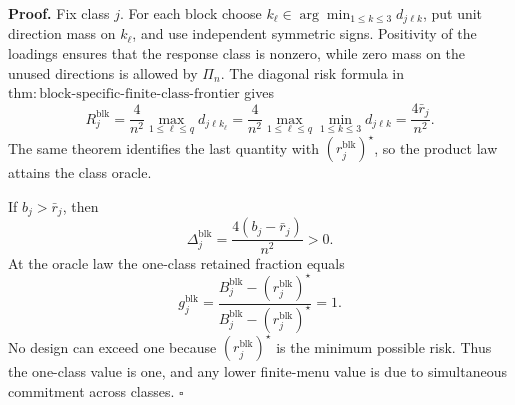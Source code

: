 \textbf{Proof.}
Fix class \(j\).  For each block choose \(k_\ell\in\arg\min_{1\le k\le3}d_{j\ell k}\), put unit direction mass on \(k_\ell\), and use independent symmetric signs.  Positivity of the loadings ensures that the response class is nonzero, while zero mass on the unused directions is allowed by \(\Pi_n\).  The diagonal risk formula in \(\mathrm{thm:block\text{-}specific\text{-}finite\text{-}class\text{-}frontier}\) gives
\[
R_j^{\mathrm{blk}}
=\frac4{n^2}\max_{1\le\ell\le q}d_{j\ell k_\ell}
=\frac4{n^2}\max_{1\le\ell\le q}\min_{1\le k\le3}d_{j\ell k}
=\frac{4\bar r_j}{n^2}.
\tag{1}
\]
The same theorem identifies the last quantity with \((r_j^{\mathrm{blk}})^\star\), so the product law attains the class oracle.

If \(b_j>\bar r_j\), then
\[
\Delta_j^{\mathrm{blk}}
=\frac{4(b_j-\bar r_j)}{n^2}>0.
\tag{2}
\]
At the oracle law the one-class retained fraction equals
\[
g_j^{\mathrm{blk}}
=\frac{B_j^{\mathrm{blk}}-(r_j^{\mathrm{blk}})^\star}
{B_j^{\mathrm{blk}}-(r_j^{\mathrm{blk}})^\star}=1.
\tag{3}
\]
No design can exceed one because \((r_j^{\mathrm{blk}})^\star\) is the minimum possible risk.  Thus the one-class value is one, and any lower finite-menu value is due to simultaneous commitment across classes.  \(\square\)